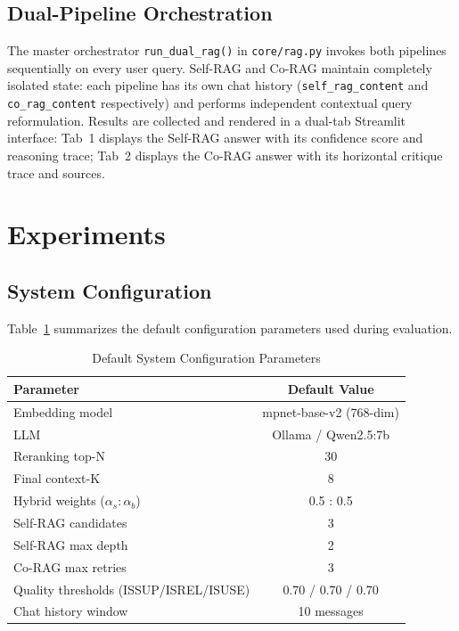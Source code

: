 \documentclass[10pt, conference, a4paper, compsocconf]{IEEEtran}
\begin{document}
\subsection{Dual-Pipeline Orchestration}

The master orchestrator \texttt{run\_dual\_rag()} in \texttt{core/rag.py}
invokes both pipelines sequentially on every user query. Self-RAG and
Co-RAG maintain completely isolated state: each pipeline has its own
chat history (\texttt{self\_rag\_content} and \texttt{co\_rag\_content}
respectively) and performs independent contextual query reformulation.
Results are collected and rendered in a dual-tab Streamlit interface:
Tab~1 displays the Self-RAG answer with its confidence score and
reasoning trace; Tab~2 displays the Co-RAG answer with its horizontal
critique trace and sources.


\section{Experiments}

\subsection{System Configuration}

Table~\ref{tab:config} summarizes the default configuration parameters
used during evaluation.

\begin{table}[H]
\renewcommand{\arraystretch}{1.2}
\caption{Default System Configuration Parameters}
\label{tab:config}
\centering
\footnotesize
\begin{tabular}{|p{}|c|}
\hline
\textbf{Parameter} & \textbf{Default Value} \\
\hline
Embedding model & mpnet-base-v2 (768-dim) \\
\hline
LLM & Ollama / Qwen2.5:7b \\
\hline
Reranking top-N & 30 \\
\hline
Final context-K & 8 \\
\hline
Hybrid weights ($\alpha_s : \alpha_b$) & 0.5 : 0.5 \\
\hline
Self-RAG candidates & 3 \\
\hline
Self-RAG max depth & 2 \\
\hline
Co-RAG max retries & 3 \\
\hline
Quality thresholds (ISSUP/ISREL/ISUSE) & 0.70 / 0.70 / 0.70 \\
\hline
Chat history window & 10 messages \\
\hline
\end{tabular}
\end{table}
\end{document}
